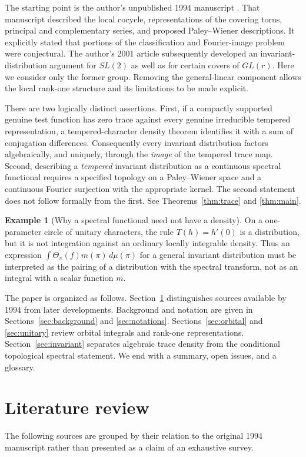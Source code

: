 \documentclass[12pt,letterpaper]{article}
\theoremstyle{definition}
\newtheorem{example}[theorem]{Example}
\theoremstyle{remark}
\begin{document}
The starting point is the author's unpublished 1994 manuscript
\cite{Jo94}.  That manuscript described the local cocycle, representations
of the covering torus, principal and complementary series, and proposed
Paley--Wiener descriptions.  It explicitly stated that portions of the
classification and Fourier-image problem were conjectural.  The author's
2001 article \cite{Jo01} subsequently developed an invariant-distribution
argument for $SL(2)$ as well as for certain covers of $GL(r)$.  Here we
consider only the former group.  Removing the general-linear component
allows the local rank-one structure and its limitations to be made explicit.

There are two logically distinct assertions.  First, if a compactly
supported genuine test function has zero trace against every genuine
irreducible tempered representation, a tempered-character density theorem
identifies it with a sum of conjugation differences.  Consequently every
invariant distribution factors algebraically, and uniquely, through the
\emph{image} of the tempered trace map.  Second, describing a \emph{tempered}
invariant distribution as a continuous spectral functional requires a
specified topology on a Paley--Wiener space and a continuous Fourier
surjection with the appropriate kernel.  The second statement does not
follow formally from the first.  See Theorems~\ref{thm:trace}
and \ref{thm:main}.

\begin{example}[Why a spectral functional need not have a density]\label{ex:derivative}
On a one-parameter circle of unitary characters, the rule
$T(h)=h'(0)$ is a distribution, but it is not integration against an
ordinary locally integrable density.  Thus an expression
$\int\Theta_\pi(f)m(\pi)\,d\mu(\pi)$ for a general invariant
distribution must be interpreted as the pairing of a distribution with
the spectral transform, not as an integral with a scalar function $m$.
\end{example}

The paper is organized as follows.  Section~\ref{sec:lit} distinguishes
sources available by 1994 from later developments.  Background and
notation are given in Sections~\ref{sec:background} and
\ref{sec:notations}.  Sections~\ref{sec:orbital} and
\ref{sec:unitary} review orbital integrals and rank-one representations.
Section~\ref{sec:invariant} separates algebraic trace density from the
conditional topological spectral statement.  We end with a summary,
open issues, and a glossary.

\section{Literature review}\label{sec:lit}
The following sources are grouped by their relation to the original
1994 manuscript rather than presented as a claim of an exhaustive survey.
\end{document}
